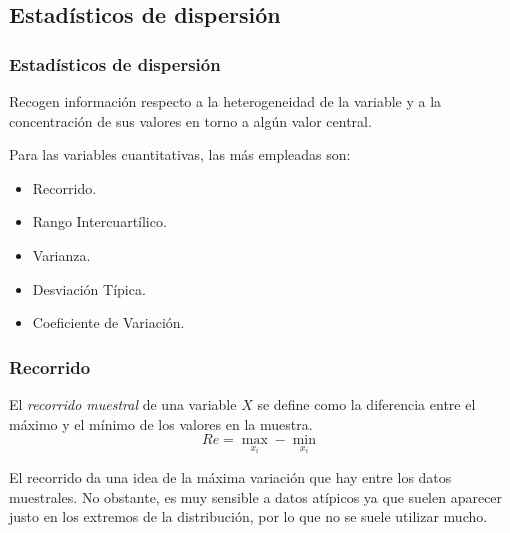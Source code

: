 \subsection{Estadísticos de dispersión}
\begin{frame}
\frametitle{Estadísticos de dispersión}
Recogen información respecto a la heterogeneidad de la variable y a la concentración de sus valores en torno a algún valor central.


Para las variables cuantitativas, las más empleadas son:
\begin{itemize}
\item Recorrido.
\item Rango Intercuartílico.
\item Varianza.
\item Desviación Típica.
\item Coeficiente de Variación.
\end{itemize}
\end{frame}


\begin{frame}
\frametitle{Recorrido}
\begin{definicion}
El \emph{recorrido muestral} de una variable $X$ se define como la diferencia entre el máximo y el mínimo de los valores en la muestra.
\[Re = \max_{x_i} -\min_{x_i}\]
\end{definicion}
El recorrido da una idea de la máxima variación que hay entre los datos muestrales. No obstante, es muy sensible a datos atípicos ya que suelen aparecer justo en los extremos de la distribución, por lo que no se suele utilizar mucho.

\begin{center}
\scalebox{0.8}{}
\end{center}
\end{frame}


